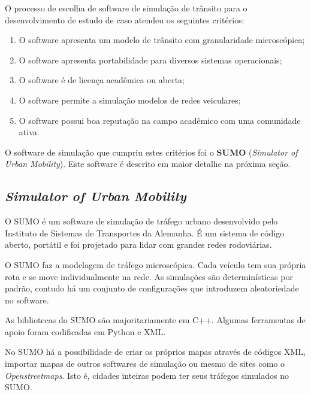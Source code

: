 \documentclass[
12pt,				%
openright,			%
oneside,			%
a4paper,			%
brazil,				%
]{abntex2}
\begin{document}
	\par O processo de escolha de software de simulação de trânsito para o desenvolvimento de estudo de caso atendeu os seguintes critérios:
	
	\begin{enumerate}
		\item O software apresenta um modelo de trânsito com granularidade microscópica;
		\item O software apresenta portabilidade para diversos sistemas operacionais;
		\item O software é de licença acadêmica ou aberta;
		\item O software permite a simulação modelos de redes veiculares;
		\item O software possui boa reputação na campo acadêmico com uma comunidade ativa.		
	\end{enumerate}

	\par O software de simulação que cumpriu estes critérios foi o \textbf{SUMO} (\textit{Simulator of Urban Mobility}). Este software é descrito em maior detalhe na próxima seção.
	
	\subsection{\textit{Simulator of Urban Mobility}}
	
	\par O SUMO é um software de simulação de tráfego urbano desenvolvido pelo Instituto de Sistemas de Transportes da Alemanha. É um sistema de código aberto, portátil e foi projetado para lidar com grandes redes rodoviárias.
	
	\par O SUMO faz a modelagem de tráfego microscópica. Cada veículo tem sua própria rota e se move individualmente na rede. As simulações são determinísticas por padrão, contudo há um conjunto de configurações que introduzem aleatoriedade no software.
	
	\par As bibliotecas do SUMO são majoritariamente em C++. Algumas ferramentas de apoio foram codificadas em Python e XML.
	
	\par No SUMO há a possibilidade de criar os próprios mapas através de códigos XML, importar mapas de outros softwares de simulação ou mesmo de sites como o \textit{Openstreetmaps}. Isto é, cidades inteiras podem ter seus tráfegos simulados no SUMO.
	
\end{document}

